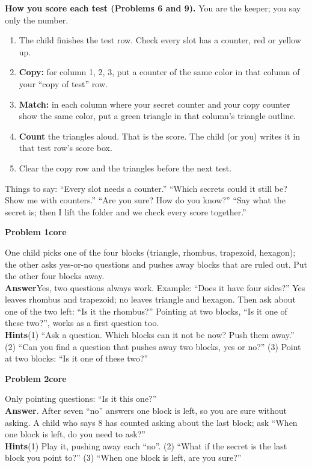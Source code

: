 \documentclass[11pt]{article}
\newcommand{\core}{\textcolor{tagcore}{\textbf{core}}}
\newcommand{\pb}[3]{\par\needspace{5\baselineskip}\medskip\textbf{Problem #1}\enspace{\small page #2}\enspace\textperiodcentered\enspace #3\par\nopagebreak}
\newcommand{\lab}[1]{\textbf{#1}\enspace}
\newcommand{\hints}[1]{\lab{Hints}#1}
\begin{document}
\begin{tcolorbox}[gbox]
\textbf{How you score each test (Problems 6 and 9).} You are the keeper; you say only the number.
\begin{enumerate}
\item The child finishes the test row. Check every slot has a counter, red or yellow up.
\item \textbf{Copy:} for column 1, 2, 3, put a counter of the same color in that column of your ``copy of test'' row.
\item \textbf{Match:} in each column where your secret counter and your copy counter show the same color, put a green triangle in that column's triangle outline.
\item \textbf{Count} the triangles aloud. That is the score. The child (or you) writes it in that test row's score box.
\item Clear the copy row and the triangles before the next test.
\end{enumerate}
Things to say: ``Every slot needs a counter.'' ``Which secrets could it still be? Show me with counters.'' ``Are you sure? How do you know?'' ``Say what the secret is; then I lift the folder and we check every score together.''
\end{tcolorbox}

\pb{1}{1}{\core}
One child picks one of the four blocks (triangle, rhombus, trapezoid, hexagon); the other asks yes-or-no questions and pushes away blocks that are ruled out. Put the other four blocks away.\\
\lab{Answer}Yes, two questions always work. Example: ``Does it have four sides?'' Yes leaves rhombus and trapezoid; no leaves triangle and hexagon. Then ask about one of the two left: ``Is it the rhombus?'' Pointing at two blocks, ``Is it one of these two?'', works as a first question too.\\
\hints{(1) ``Ask a question. Which blocks can it not be now? Push them away.'' (2) ``Can you find a question that pushes away two blocks, yes or no?'' (3) Point at two blocks: ``Is it one of these two?''}

\pb{2}{1}{\core}
Only pointing questions: ``Is it this one?''\\
\lab{Answer}7. After seven ``no'' answers one block is left, so you are sure without asking. A child who says 8 has counted asking about the last block; ask ``When one block is left, do you need to ask?''\\
\hints{(1) Play it, pushing away each ``no''. (2) ``What if the secret is the last block you point to?'' (3) ``When one block is left, are you sure?''}
\end{document}
